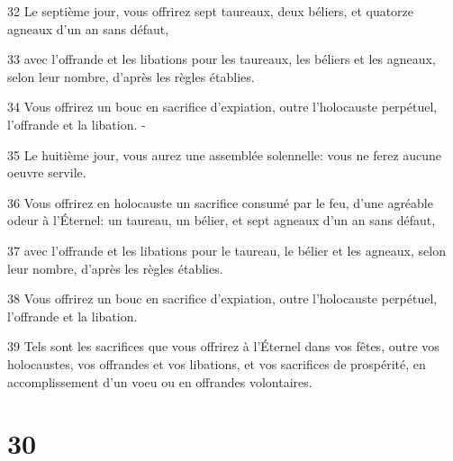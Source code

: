 \par 32 Le septième jour, vous offrirez sept taureaux, deux béliers, et quatorze agneaux d'un an sans défaut,
\par 33 avec l'offrande et les libations pour les taureaux, les béliers et les agneaux, selon leur nombre, d'après les règles établies.
\par 34 Vous offrirez un bouc en sacrifice d'expiation, outre l'holocauste perpétuel, l'offrande et la libation. -
\par 35 Le huitième jour, vous aurez une assemblée solennelle: vous ne ferez aucune oeuvre servile.
\par 36 Vous offrirez en holocauste un sacrifice consumé par le feu, d'une agréable odeur à l'Éternel: un taureau, un bélier, et sept agneaux d'un an sans défaut,
\par 37 avec l'offrande et les libations pour le taureau, le bélier et les agneaux, selon leur nombre, d'après les règles établies.
\par 38 Vous offrirez un bouc en sacrifice d'expiation, outre l'holocauste perpétuel, l'offrande et la libation.
\par 39 Tels sont les sacrifices que vous offrirez à l'Éternel dans vos fêtes, outre vos holocaustes, vos offrandes et vos libations, et vos sacrifices de prospérité, en accomplissement d'un voeu ou en offrandes volontaires.

\chapter{30}

